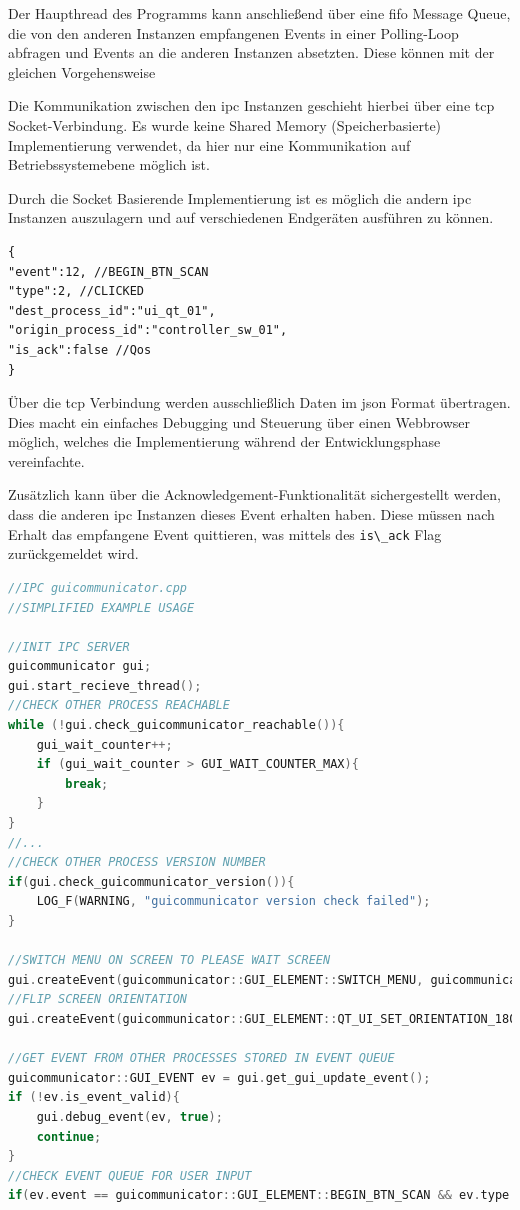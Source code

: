 Der Haupthread des Programms kann anschließend über eine \gls{fifo}
Message Queue, die von den anderen Instanzen empfangenen Events in einer
Polling-Loop abfragen und Events an die anderen Instanzen absetzten.
Diese können mit der gleichen Vorgehensweise

Die Kommunikation zwischen den \gls{ipc} Instanzen geschieht hierbei
über eine \gls{tcp} Socket-Verbindung. Es wurde keine Shared Memory
(Speicherbasierte) Implementierung verwendet, da hier nur eine
Kommunikation auf Betriebssystemebene möglich ist.

Durch die Socket Basierende Implementierung ist es möglich die andern
\gls{ipc} Instanzen auszulagern und auf verschiedenen Endgeräten
ausführen zu können.

\begin{lstlisting}
{
"event":12, //BEGIN_BTN_SCAN
"type":2, //CLICKED
"dest_process_id":"ui_qt_01",
"origin_process_id":"controller_sw_01",
"is_ack":false //Qos
}
\end{lstlisting}

Über die \gls{tcp} Verbindung werden ausschließlich Daten im \gls{json}
Format übertragen. Dies macht ein einfaches Debugging und Steuerung über
einen Webbrowser möglich, welches die Implementierung während der
Entwicklungsphase vereinfachte.

Zusätzlich kann über die Acknowledgement-Funktionalität sichergestellt
werden, dass die anderen \gls{ipc} Instanzen dieses Event erhalten
haben. Diese müssen nach Erhalt das empfangene Event quittieren, was
mittels des \passthrough{\lstinline!is\_ack!} Flag zurückgemeldet wird.

\begin{lstlisting}[language={C++}]
//IPC guicommunicator.cpp
//SIMPLIFIED EXAMPLE USAGE

//INIT IPC SERVER
guicommunicator gui;
gui.start_recieve_thread();
//CHECK OTHER PROCESS REACHABLE
while (!gui.check_guicommunicator_reachable()){
    gui_wait_counter++;
    if (gui_wait_counter > GUI_WAIT_COUNTER_MAX){
        break;
    }
}
//...
//CHECK OTHER PROCESS VERSION NUMBER
if(gui.check_guicommunicator_version()){
    LOG_F(WARNING, "guicommunicator version check failed");
}

//SWITCH MENU ON SCREEN TO PLEASE WAIT SCREEN
gui.createEvent(guicommunicator::GUI_ELEMENT::SWITCH_MENU, guicommunicator::GUI_VALUE_TYPE::PROCESSING_SCREEN);
//FLIP SCREEN ORIENTATION
gui.createEvent(guicommunicator::GUI_ELEMENT::QT_UI_SET_ORIENTATION_180, guicommunicator::GUI_VALUE_TYPE::ENABLED);

//GET EVENT FROM OTHER PROCESSES STORED IN EVENT QUEUE
guicommunicator::GUI_EVENT ev = gui.get_gui_update_event();
if (!ev.is_event_valid){
    gui.debug_event(ev, true);
    continue;
}
//CHECK EVENT QUEUE FOR USER INPUT
if(ev.event == guicommunicator::GUI_ELEMENT::BEGIN_BTN_SCAN && ev.type == guicommunicator::GUI_VALUE_TYPE::CLICKED) {}
\end{lstlisting}

